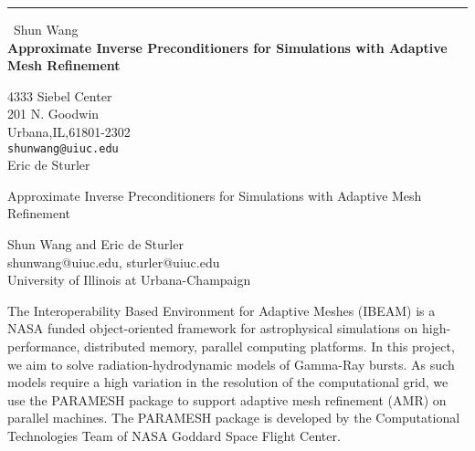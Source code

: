 \documentclass{report}
\begin{document}
\begin{center}
\rule{6in}{1pt} \
{\large Shun Wang \\
{\bf Approximate Inverse Preconditioners for Simulations with Adaptive Mesh Refinement}}

4333 Siebel Center \\ 201 N. Goodwin \\ Urbana,IL,61801-2302
\\
{\tt shunwang@uiuc.edu}\\
Eric de Sturler\end{center}

\begin{center}
Approximate Inverse Preconditioners for Simulations with Adaptive Mesh Refinement\\

\bigskip

Shun Wang and Eric de Sturler\\
shunwang@uiuc.edu, sturler@uiuc.edu\\
University of Illinois at Urbana-Champaign\\
\end{center}
\bigskip

The Interoperability Based Environment for Adaptive Meshes (IBEAM) is a
NASA funded object-oriented framework for astrophysical simulations on
high-performance, distributed memory, parallel computing platforms. In
this project, we aim to solve radiation-hydrodynamic models of Gamma-Ray
bursts. As such models require a high variation in the resolution of the
computational grid, we use the PARAMESH package to support adaptive mesh
refinement (AMR) on parallel machines. The PARAMESH package is developed
by the Computational Technologies
Team of NASA Goddard Space Flight Center.\\
\end{document}
